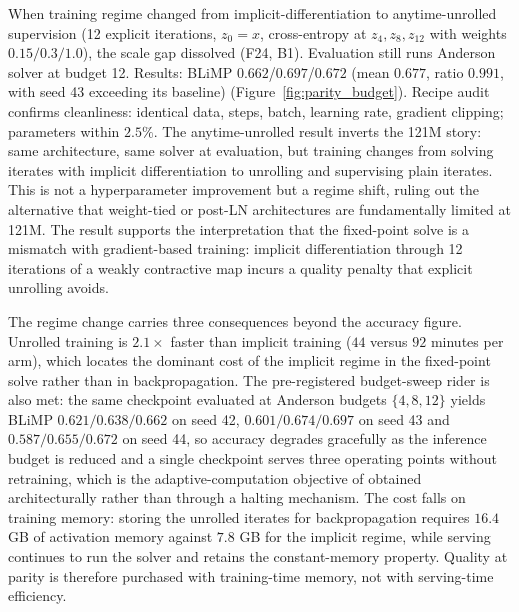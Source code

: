 When training regime changed from implicit-differentiation to anytime-unrolled supervision (12 explicit iterations, $z_0=x$, cross-entropy at $z_4, z_8, z_{12}$ with weights $0.15/0.3/1.0$), the scale gap dissolved (F24, B1). Evaluation still runs Anderson solver at budget 12. Results: BLiMP $0.662$\slash$0.697$\slash$0.672$ (mean $0.677$, ratio $\mathbf{0.991}$, with seed 43 exceeding its baseline) (Figure~\ref{fig:parity_budget}). Recipe audit confirms cleanliness: identical data, steps, batch, learning rate, gradient clipping; parameters within $2.5\%$. The anytime-unrolled result inverts the 121M story: same architecture, same solver at evaluation, but training changes from solving iterates with implicit differentiation to unrolling and supervising plain iterates. This is not a hyperparameter improvement but a regime shift, ruling out the alternative that weight-tied or post-LN architectures are fundamentally limited at 121M. The result supports the interpretation that the fixed-point solve is a mismatch with gradient-based training: implicit differentiation through 12 iterations of a weakly contractive map incurs a quality penalty that explicit unrolling avoids.

The regime change carries three consequences beyond the accuracy figure. Unrolled training is $2.1\times$ faster than implicit training ($44$ versus $92$ minutes per arm), which locates the dominant cost of the implicit regime in the fixed-point solve rather than in backpropagation. The pre-registered budget-sweep rider is also met: the same checkpoint evaluated at Anderson budgets $\{4, 8, 12\}$ yields BLiMP $0.621/0.638/0.662$ on seed 42, $0.601/0.674/0.697$ on seed 43 and $0.587/0.655/0.672$ on seed 44, so accuracy degrades gracefully as the inference budget is reduced and a single checkpoint serves three operating points without retraining, which is the adaptive-computation objective of \citet{Graves2016} obtained architecturally rather than through a halting mechanism. The cost falls on training memory: storing the unrolled iterates for backpropagation requires $16.4$ GB of activation memory against $7.8$ GB for the implicit regime, while serving continues to run the solver and retains the constant-memory property. Quality at parity is therefore purchased with training-time memory, not with serving-time efficiency.

